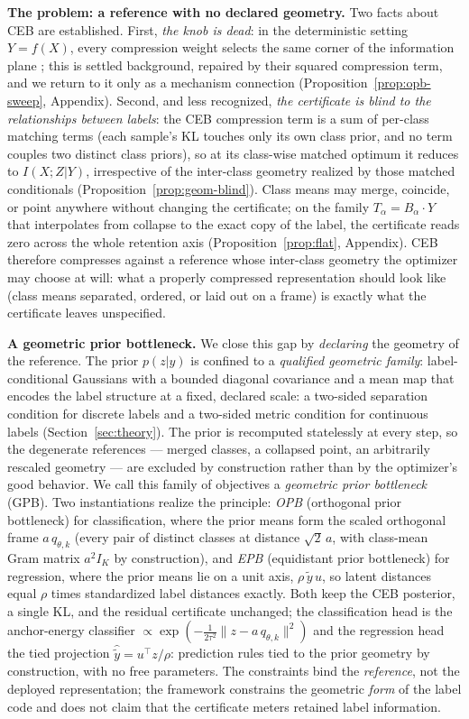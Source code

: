 \documentclass{article} %
\theoremstyle{plain}
\theoremstyle{remark}
\begin{document}
\textbf{The problem: a reference with no declared geometry.} Two facts about CEB are
established. First, \emph{the knob is dead}: in the deterministic setting $Y = f(X)$,
every compression weight selects the same corner of the information plane
\citep{kolchinsky2019caveats}; this is settled background, repaired by their squared
compression term, and we return to it only as a mechanism connection
(Proposition~\ref{prop:opb-sweep}, Appendix). Second, and less recognized, \emph{the
certificate is blind to the relationships between labels}: the CEB compression term is
a sum of per-class matching terms (each sample's KL touches only its own class
prior, and no term couples two distinct class priors), so at its class-wise matched
optimum it reduces to $I(X;Z|Y)$, irrespective of the inter-class geometry realized by
those matched conditionals (Proposition~\ref{prop:geom-blind}). Class means may merge,
coincide, or point anywhere without changing the certificate; on the family
$T_\alpha = B_\alpha\cdot Y$ that interpolates from collapse to the exact copy of the
label, the certificate reads zero across the whole retention axis
(Proposition~\ref{prop:flat}, Appendix). CEB therefore compresses against a reference
whose inter-class geometry the optimizer may choose at will: what a properly compressed
representation should look like (class means separated, ordered, or laid out on a
frame) is exactly what the certificate leaves unspecified.

\textbf{A geometric prior bottleneck.} We close this gap by \emph{declaring} the
geometry of the reference. The prior $p(z|y)$ is confined to a \emph{qualified
geometric family}: label-conditional Gaussians with a bounded diagonal covariance and
a mean map that encodes the label structure at a fixed, declared scale: a two-sided
separation condition for discrete labels and a two-sided metric condition for
continuous labels (Section~\ref{sec:theory}). The prior is recomputed statelessly at
every step, so the degenerate references --- merged classes, a collapsed point, an
arbitrarily rescaled geometry --- are excluded by construction rather than by the
optimizer's good behavior. We call this family of objectives a \emph{geometric prior
bottleneck} (GPB). Two instantiations realize the principle: \emph{OPB} (orthogonal
prior bottleneck) for classification, where the prior means form the scaled orthogonal
frame $a\,q_{\theta,k}$ (every pair of distinct classes at distance $\sqrt2\,a$,
with class-mean Gram matrix $a^2 I_K$ by construction), and \emph{EPB} (equidistant
prior bottleneck) for regression, where the prior means lie on a unit axis,
$\rho\,\tilde y\,u$, so latent distances equal $\rho$ times standardized label
distances exactly. Both keep the CEB posterior, a single KL, and the residual
certificate unchanged; the classification head is the anchor-energy classifier
$\propto \exp(-\tfrac{1}{2\tau^2}\|z - a\,q_{\theta,k}\|^2)$ and the regression head
the tied projection $\hat{\tilde y} = u^{\top}z/\rho$: prediction rules tied to the
prior geometry by construction, with no free parameters. The constraints bind the
\emph{reference}, not the deployed representation; the framework constrains the
geometric \emph{form} of the label code and does not claim that the certificate meters
retained label information.
\end{document}
